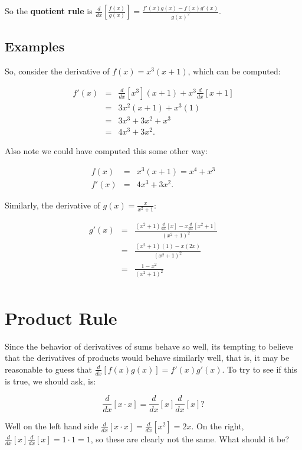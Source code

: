 So the \textbf{ quotient rule} is $\frac{d}{dx}[\frac{f(x)}{g(x)}]=\frac{f'(x)g(x)-f(x)g'(x)}{g(x)^2}$.


\subsection{Examples}

So, consider the derivative of $f(x)=x^3(x+1)$, which can be computed:

\begin{eqnarray*}
f'(x)&=&\frac{d}{dx}[x^3](x+1)+x^3\frac{d}{dx}[x+1]\\
&=&3x^2(x+1)+x^3(1)\\
&=&3x^3+3x^2+x^3\\
&=&4x^3+3x^2.
\end{eqnarray*}

Also note we could have computed this some other way:

\begin{eqnarray*}
f(x)&=&x^3(x+1)=x^4+x^3\\
f'(x)&=&4x^3+3x^2.
\end{eqnarray*}

Similarly, the derivative of $g(x)=\frac{x}{x^2+1}$:

\begin{eqnarray*}
g'(x)&=&\frac{(x^2+1)\frac{d}{dx}[x]-x\frac{d}{dx}[x^2+1]}{(x^2+1)^2}\\
&=&\frac{(x^2+1)(1)-x(2x)}{(x^2+1)^2}\\
&=&\frac{1-x^2}{(x^2+1)^2}\\
\end{eqnarray*}




\section{Product Rule}

Since the behavior of derivatives of sums behave so well, its tempting to believe that the derivatives of products would behave similarly well, that is, it may be reasonable to guess that $\frac{d}{dx}[f(x)g(x)]=f'(x)g'(x)$.  To try to see if this is true, we should ask, is:

$$\frac{d}{dx}[x\cdot x]=\frac{d}{dx}[x]\frac{d}{dx}[x]?$$

Well on the left hand side $\frac{d}{dx}[x\cdot x]=\frac{d}{dx}[x^2]=2x$.  On the right, $\frac{d}{dx}[x]\frac{d}{dx}[x]=1\cdot1=1$, so these are clearly not the same.  What should it be?\\

